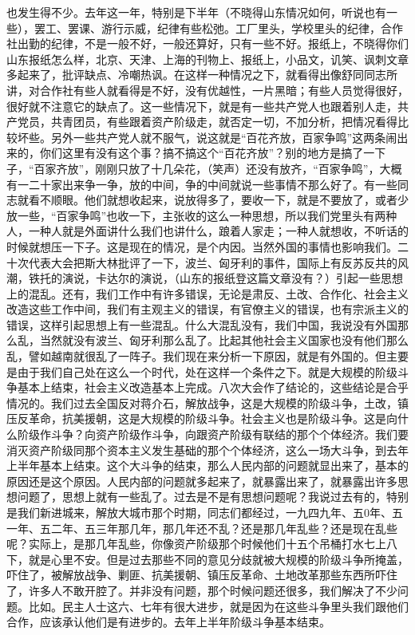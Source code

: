 也发生得不少。去年这一年，特别是下半年（不晓得山东情况如何，听说也有一些），罢工、罢课、游行示威，纪律有些松弛。工厂里头，学校里头的纪律，合作社出勤的纪律，不是一般不好，一般还算好，只有一些不好。报纸上，不晓得你们山东报纸怎么样，北京、天津、上海的刊物上、报纸上，小品文，讥笑、讽刺文章多起来了，批评缺点、冷嘲热讽。在这样一种情况之下，就看得出像舒同同志所讲，对合作社有些人就看得是不好，没有优越性，一片黑暗；有些人员觉得很好，很好就不注意它的缺点了。这一些情况下，就是有一些共产党人也跟着别人走，共产党员，共青团员，有些跟着资产阶级走，就否定一切，不加分析，把情况看得比较坏些。另外一些共产党人就不服气，说这就是“百花齐放，百家争鸣”这两条闹出来的，你们这里有没有这个事？搞不搞这个“百花齐放”？别的地方是搞了一下子，“百家齐放”，刚刚只放了十几朵花，（笑声）还没有放齐，“百家争鸣”，大概有一二十家出来争一争，放的中间，争的中间就说一些事情不那么好了。有一些同志就看不顺眼。他们就想收起来，说放得多了，要收一下，就是不要放了，或者少放一些，“百家争鸣”也收一下，主张收的这么一种思想，所以我们党里头有两种人，一种人就是外面讲什么我们也讲什么，踉着人家走；一种人就想收，不听话的时候就想压一下子。这是现在的情况，是个内因。当然外国的事情也影响我们。二十次代表大会把斯大林批评了一下，波兰、匈牙利的事件，国际上有反苏反共的风潮，铁托的演说，卡达尔的演说，（山东的报纸登这篇文章没有？）引起一些思想上的混乱。还有，我们工作中有许多错误，无论是肃反、土改、合作化、社会主义改造这些工作中间，我们有主观主义的错误，有官僚主义的错误，也有宗派主义的错误，这样引起思想上有一些混乱。什么大混乱没有，我们中国，我说没有外国那么乱，当然就没有波兰、匈牙利那么乱了。比起其他社会主义国家也没有他们那么乱，譬如越南就很乱了一阵子。我们现在来分析一下原因，就是有外国的。但主要是由于我们自己处在这么一个时代，处在这样一个条件之下。就是大规模的阶级斗争基本上结束，社会主义改造基本上完成。八次大会作了结论的，这些结论是合乎情况的。我们过去全国反对蒋介石，解放战争，这是大规模的阶级斗争，土改，镇压反革命，抗美援朝，这是大规模的阶级斗争。社会主义也是阶级斗争。这是向什么阶级作斗争？向资产阶级作斗争，向跟资产阶级有联结的那个个体经济。我们要消灭资产阶级同那个资本主义发生基础的那个个体经济，这么一场大斗争，到去年上半年基本上结束。这个大斗争的结束，那么人民内部的问题就显出来了，基本的原因还是这个原因。人民内部的问题就多起来了，就暴露出来了，就暴露出许多思想问题了，思想上就有一些乱了。过去是不是有思想问题呢？我说过去有的，特别是我们新进城来，解放大城市那个时期，同志们都经过，一九四九年、五0年、五一年、五二年、五三年那几年，那几年还不乱？还是那几年乱些？还是现在乱些呢？实际上，是那几年乱些，你像资产阶级那个时候他们十五个吊桶打水七上八下，就是心里不安。但是过去那些不同的意见分歧就被大规模的阶级斗争所掩盖，吓住了，被解放战争、剿匪、抗美援朝、镇压反革命、土地改革那些东西所吓住了，许多人不敢开腔了。并非没有问题，那个时候问题还很多，我们解决了不少问题。比如。民主人士这六、七年有很大进步，就是因为在这些斗争里头我们跟他们合作，应该承认他们是有进步的。去年上半年阶级斗争基本结束。

